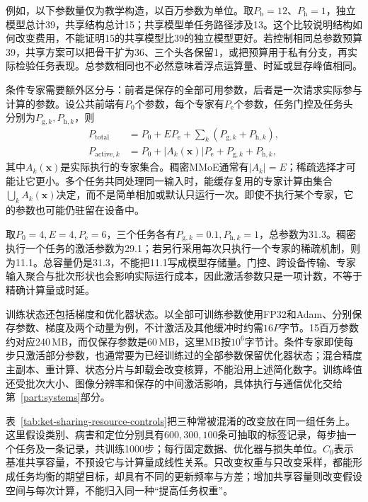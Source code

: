 例如，以下参数量仅为教学构造，以百万参数为单位。取$P_{\mathrm b}=12$、$P_{\mathrm h}=1$，独立模型总计39，共享结构总计15；共享模型单任务路径涉及13。这个比较说明结构如何改变费用，不能证明15的共享模型比39的独立模型更好。若控制相同总参数预算39，共享方案可以把骨干扩为36、三个头各保留1，或把预算用于私有分支，再实际检验任务表现。总参数相同也不必然意味着浮点运算量、时延或显存峰值相同。

条件专家需要额外区分与：前者是保存的全部可用参数，后者是一次请求实际参与计算的参数。设公共前端有$P_0$个参数，每个专家有$P_{\mathrm e}$个参数，任务门控及任务头分别为$P_{\mathrm g,k},P_{\mathrm h,k}$，则
\begin{align}
  P_{\mathrm{total}}
    &=P_0+EP_{\mathrm e}
      +\sum_k(P_{\mathrm g,k}+P_{\mathrm h,k}),
  \nonumber\\
  P_{\mathrm{active},k}
    &=P_0+|A_k(\bm x)|P_{\mathrm e}
      +P_{\mathrm g,k}+P_{\mathrm h,k},
  \label{eq:ket-sharing-expert-budget}
\end{align}
其中$A_k(\bm x)$是实际执行的专家集合。稠密MMoE通常有$|A_k|=E$；稀疏选择才可能让它更小。多个任务共同处理同一输入时，能缓存复用的专家计算由集合$\bigcup_kA_k(\bm x)$决定，而不是简单相加或默认只运行一次。即使不执行某个专家，它的参数也可能仍驻留在设备中。

取$P_0=4,E=4,P_{\mathrm e}=6$，三个任务各有$P_{\mathrm g,k}=0.1,P_{\mathrm h,k}=1$，总参数为31.3。稠密执行一个任务的激活参数为29.1；若另行采用每次只执行一个专家的稀疏机制，则为11.1。总容量仍是31.3，不能把11.1写成模型存储量。门控、跨设备传输、专家输入聚合与批次形状也会影响实际运行成本，因此激活参数只是一项计数，不等于精确计算量或时延。

训练状态还包括梯度和优化器状态。以全部可训练参数使用FP32和Adam、分别保存参数、梯度及两个动量为例，不计激活及其他缓冲时约需$16P$字节。15百万参数约对应240\,MB，而仅保存参数是60\,MB，这里MB按$10^6$字节计。条件专家即使每步只激活部分参数，也通常要为已经训练过的全部参数保留优化器状态；混合精度主副本、重计算、状态分片与卸载会改变核算，不能沿用上述简化数字。训练峰值还受批次大小、图像分辨率和保存的中间激活影响，具体执行与通信优化交给第~\ref{part:systems}部分。

表~\ref{tab:ket-sharing-resource-controls}把三种常被混淆的改变放在同一组任务上。这里假设类别、病害和定位分别具有$600,300,100$条可抽取的标签记录，每步抽一个任务及一条记录，共训练1000步；每行固定数据、优化器与损失单位。$C_0$表示基准共享容量，不预设它与计算量成线性关系。只改变权重与只改变采样，都能形成任务均衡的期望目标，却具有不同的更新频率与方差；增加共享容量则改变假设空间与每次计算，不能归入同一种“提高任务权重”。

